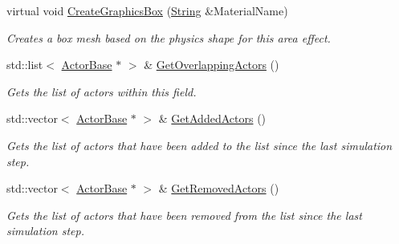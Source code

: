 \begin{DoxyCompactItemize}
virtual void \hyperlink{classphys_1_1AreaEffect_afa5456c457c8fa61bd3ea5d83f3296a4}{CreateGraphicsBox} (\hyperlink{namespacephys_aa03900411993de7fbfec4789bc1d392e}{String} \&MaterialName)
\begin{DoxyCompactList}\small\item\em Creates a box mesh based on the physics shape for this area effect. \item\end{DoxyCompactList}\item 
std::list$<$ \hyperlink{classphys_1_1ActorBase}{ActorBase} $\ast$ $>$ \& \hyperlink{classphys_1_1AreaEffect_ab995fec11d9e5fbae1851109067958db}{GetOverlappingActors} ()
\begin{DoxyCompactList}\small\item\em Gets the list of actors within this field. \item\end{DoxyCompactList}\item 
std::vector$<$ \hyperlink{classphys_1_1ActorBase}{ActorBase} $\ast$ $>$ \& \hyperlink{classphys_1_1AreaEffect_a72a9673c926ce876df630c4aecfc09f6}{GetAddedActors} ()
\begin{DoxyCompactList}\small\item\em Gets the list of actors that have been added to the list since the last simulation step. \item\end{DoxyCompactList}\item 
std::vector$<$ \hyperlink{classphys_1_1ActorBase}{ActorBase} $\ast$ $>$ \& \hyperlink{classphys_1_1AreaEffect_a021763db69e977a3a19ad7cc39df073b}{GetRemovedActors} ()
\begin{DoxyCompactList}\small\item\em Gets the list of actors that have been removed from the list since the last simulation step. \item\end{DoxyCompactList}\end{DoxyCompactItemize}
